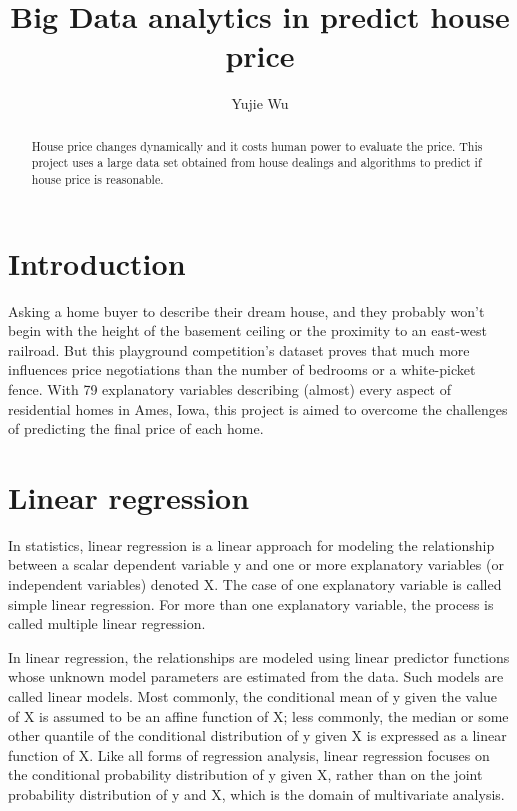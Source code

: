 \documentclass[sigconf]{acmart}
\begin{document}
\title{Big Data analytics in predict house price}


\author{Yujie Wu}



\renewcommand{\shortauthors}{B. Trovato et al.}


\begin{abstract}
\large  House price changes dynamically and it costs human power to evaluate the price. This project uses a large data set obtained from house dealings and algorithms to predict if house price is reasonable.
\end{abstract}


\maketitle

\section{Introduction}
\large Asking a home buyer to describe their dream house, and they probably won't begin with the height of the basement ceiling or the proximity to an east-west railroad. But this playground competition's dataset proves that much more influences price negotiations than the number of bedrooms or a white-picket fence. With 79 explanatory variables describing (almost) every aspect of residential homes in Ames, Iowa, this project is aimed to overcome the challenges of predicting the final price of each home.

\section{Linear regression}
\par In statistics, linear regression is a linear approach for modeling the relationship between a scalar dependent variable y and one or more explanatory variables (or independent variables) denoted X. The case of one explanatory variable is called simple linear regression. For more than one explanatory variable, the process is called multiple linear regression.

In linear regression, the relationships are modeled using linear predictor functions whose unknown model parameters are estimated from the data. Such models are called linear models. Most commonly, the conditional mean of y given the value of X is assumed to be an affine function of X; less commonly, the median or some other quantile of the conditional distribution of y given X is expressed as a linear function of X. Like all forms of regression analysis, linear regression focuses on the conditional probability distribution of y given X, rather than on the joint probability distribution of y and X, which is the domain of multivariate analysis.
\end{document}
